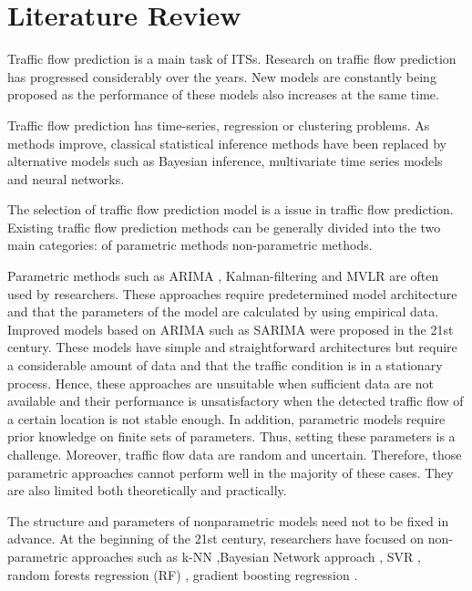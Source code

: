 \documentclass[twocolumn]{article}
\begin{document}
\section{Literature Review}
\label{sec:LR}
Traffic flow prediction is a main task of ITSs. Research on traffic flow prediction has progressed considerably over the years. New models are constantly being proposed as the performance of these models also increases at the same time. 
\par
Traffic flow prediction has time-series\citep{cheng2012spatio}, regression\citep{dunne2011regime} or clustering problems\citep{xia2012clustering}. As methods improve, classical statistical inference methods have been replaced by alternative models such as Bayesian inference, multivariate time series models and neural networks\citep{vlahogianni2004short}.
\par 
The selection of traffic flow prediction model is a issue in traffic flow prediction\citep{abdulhai1999short}. 
Existing traffic flow prediction methods can be generally divided into the two main categories: of parametric methods non-parametric methods.
\par
Parametric methods such as ARIMA \citep{ARIMA}, Kalman-filtering\citep{chen2001use,chien2003dynamic,chien2003predicting,wang2006renaissance,van2008online,Jin2013,guo2014adaptive} and MVLR  \citep{MVLR} are often used by researchers. These approaches require predetermined model architecture and that the parameters of the model are calculated by using empirical data\citep{deeptrend}. Improved models based on ARIMA such as SARIMA were proposed in the 21st century\citep{williams2001multivariate,smith2002comparison,SARIMA,williams2003modeling,chandra2009predictions}. These models have simple and straightforward architectures but require a considerable amount of data and that the traffic condition is in a stationary process. Hence, these approaches are unsuitable when sufficient data are not available and their performance is unsatisfactory when the detected traffic flow of a certain location is not stable enough. In addition, parametric models require prior knowledge on finite sets of parameters. Thus, setting these parameters is a challenge.
Moreover, traffic flow data are random and uncertain. Therefore, those parametric approaches cannot perform well in the majority of these cases.  They are also limited both theoretically and practically.
\par
The structure and parameters of nonparametric models need not to be fixed in advance\citep{ma2015long}.
At the beginning of the 21st century, researchers have focused on non-parametric approaches such as k-NN \citep{k-NN},Bayesian Network approach \citep{1603558,castillo2008predicting,sun2006bayesian}, SVR \citep{SVR,wu2004travel,asif2014spatiotemporal}, random forests regression (RF) \citep{RF}, gradient boosting regression \citep{GB}.
\end{document}
